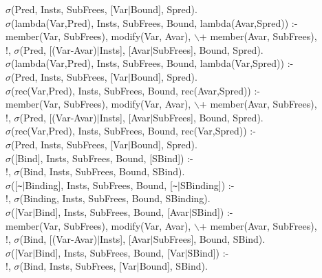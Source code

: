 \documentclass[11pt]{report}
\begin{document}
\begin{sf}
\begin{tabbing}
\hspace{2em}$\sigma$(Pred, Insts, SubFrees, [Var$\mid$Bound], Spred).\\[-0.15ex]
$\sigma$(lambda(Var,Pred), Insts, SubFrees, Bound, lambda(Avar,Spred)) :-\\[-0.15ex]
\hspace{2em}member(Var, SubFrees), modify(Var, Avar), $\backslash$+ member(Avar, SubFrees),\\[-0.15ex]
\hspace{2em}!, $\sigma$(Pred, [(Var-Avar)$\mid$Insts], [Avar$\mid$SubFrees], Bound, Spred).\\[-0.15ex]
$\sigma$(lambda(Var,Pred), Insts, SubFrees, Bound, lambda(Var,Spred)) :-\\[-0.15ex]
\hspace{2em}$\sigma$(Pred, Insts, SubFrees, [Var$\mid$Bound], Spred).\\[-0.15ex]
$\sigma$(rec(Var,Pred), Insts, SubFrees, Bound, rec(Avar,Spred)) :-\\[-0.15ex]
\hspace{2em}member(Var, SubFrees), modify(Var, Avar), $\backslash$+ member(Avar, SubFrees),\\[-0.15ex]
\hspace{2em}!, $\sigma$(Pred, [(Var-Avar)$\mid$Insts], [Avar$\mid$SubFrees], Bound, Spred).\\[-0.15ex]
$\sigma$(rec(Var,Pred), Insts, SubFrees, Bound, rec(Var,Spred)) :-\\[-0.15ex]
\hspace{2em}$\sigma$(Pred, Insts, SubFrees, [Var$\mid$Bound], Spred).\\[-0.15ex]
$\sigma$([Bind], Insts, SubFrees, Bound, [SBind]) :-\\[-0.15ex]
\hspace{2em}!, $\sigma$(Bind, Insts, SubFrees, Bound, SBind).\\[-0.15ex]
$\sigma$([{\verb`~`}$\mid$Binding], Insts, SubFrees, Bound, [{\verb`~`}$\mid$SBinding]) :-\\[-0.15ex]
\hspace{2em}!, $\sigma$(Binding, Insts, SubFrees, Bound, SBinding).\\[-0.15ex]
$\sigma$([Var$\mid$Bind], Insts, SubFrees, Bound, [Avar$\mid$SBind]) :-\\[-0.15ex]
\hspace{2em}member(Var, SubFrees), modify(Var, Avar), $\backslash$+ member(Avar, SubFrees),\\[-0.15ex]
\hspace{2em}!, $\sigma$(Bind, [(Var-Avar)$\mid$Insts], [Avar$\mid$SubFrees], Bound, SBind).\\[-0.15ex]
$\sigma$([Var$\mid$Bind], Insts, SubFrees, Bound, [Var$\mid$SBind]) :-\\[-0.15ex]
\hspace{2em}!, $\sigma$(Bind, Insts, SubFrees, [Var$\mid$Bound], SBind).
\end{tabbing}\end{sf}
\end{document}
